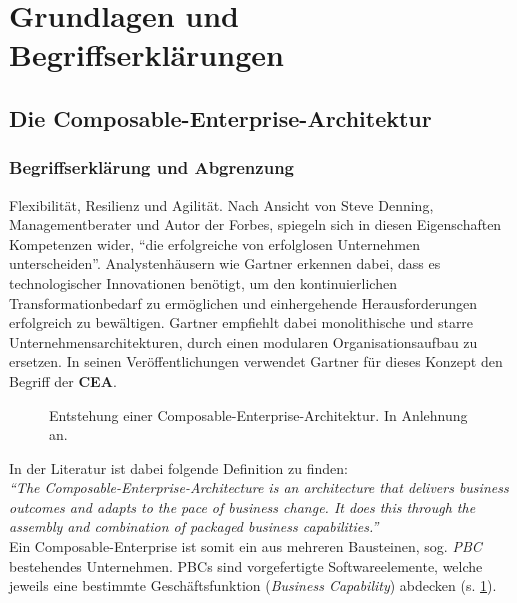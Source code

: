 \section{Grundlagen und Begriffserklärungen}

\subsection{Die Composable-Enterprise-Architektur}

\subsubsection{Begriffserklärung und Abgrenzung}
\label{sec:CEA_B}
Flexibilität, Resilienz und Agilität. Nach Ansicht von Steve Denning, Managementberater und Autor der Forbes, spiegeln sich in diesen Eigenschaften Kompetenzen wider, \enquote{die erfolgreiche von erfolglosen Unternehmen unterscheiden}. Analystenhäusern wie Gartner erkennen dabei, dass es technologischer Innovationen benötigt, um den kontinuierlichen Transformationbedarf zu ermöglichen und einhergehende Herausforderungen erfolgreich zu bewältigen. Gartner empfiehlt dabei monolithische und starre Unternehmensarchitekturen, durch einen modularen Organisationsaufbau zu ersetzen. In seinen Veröffentlichungen verwendet Gartner für dieses Konzept den Begriff der \textbf{\ac{CEA}}.
\begin{center}
	\begin{figure}[H]
		\centering
		\caption[Entstehung einer Composable-Enterprise-Architektur]{Entstehung einer Composable-Enterprise-Architektur. In Anlehnung an.}
		\label{fig:CEA}
	\end{figure}	
\end{center}
\vspace*{-15mm}
In der Literatur ist dabei folgende Definition zu finden:\vspace{2mm}\\
\textit{\enquote{The Composable-Enterprise-Architecture is an architecture that delivers business outcomes and adapts to the pace of business change. It does this through the assembly and combination of packaged business capabilities.}}\vspace{2mm}\\
Ein Composable-Enterprise ist somit ein aus mehreren Bausteinen, sog. \textit{\ac{PBC}} bestehendes Unternehmen. PBCs sind vorgefertigte Softwareelemente, welche jeweils eine bestimmte Geschäftsfunktion (\textit{Business Capability}) abdecken (s. \ref{fig:CEA}).
